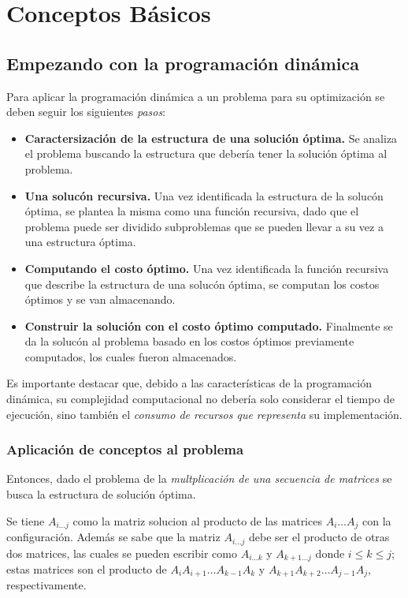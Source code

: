 \documentclass[12pt,twoside]{article}
\begin{document}
\section{Conceptos B\'asicos}
\subsection{Empezando con la programaci\'on din\'amica}
Para aplicar la programaci\'on din\'amica a un problema para su optimizaci\'on se deben seguir los siguientes \textit{pasos}:

\begin{itemize}
    \item \textbf{Caractersizaci\'on de la estructura de una soluci\'on \'optima.} Se analiza el problema buscando la estructura que deber\'ia tener la soluci\'on \'optima al problema.
    \item \textbf{Una soluc\'on recursiva.} Una vez identificada la estructura de la soluc\'on \'optima, se plantea la misma como una funci\'on recursiva, dado que el problema puede ser dividido subproblemas que se pueden llevar a su vez a una estructura \'optima.
    \item \textbf{Computando el costo \'optimo.} Una vez identificada la funci\'on recursiva que describe la estructura de una soluc\'on \'optima, se computan los costos \'optimos y se van almacenando.
    \item \textbf{Construir la soluci\'on con el costo \'optimo computado.} Finalmente se da la soluc\'on al problema basado en los costos \'optimos previamente computados, los cuales fueron almacenados.
\end{itemize}

Es importante destacar que, debido a las caracter\'isticas de la programaci\'on din\'amica, su complejidad computacional no deber\'ia solo considerar el tiempo de ejecuci\'on, sino tambi\'en el \textit{consumo de recursos que representa} su implementaci\'on.

\subsubsection{Aplicaci\'on de conceptos al problema}

Entonces, dado el problema de la \textit{multplicaci\'on de una secuencia de matrices} se busca la estructura de soluci\'on \'optima. 

Se tiene $A_{i\dots j}$ como la matriz solucion al producto de las matrices $A_i \dots A_j$ con la configuraci\'on. Adem\'as se sabe que la matriz $A_{i \dots j}$ debe ser el producto de otras dos matrices, las cuales se pueden escribir como $A_{i \dots k}$ y $A_{k+1 \dots j}$ donde $i \leq k \leq j$; estas matrices son el producto de $A_i A_{i+1} \dots A_{k-1} A_k$ y $A_{k + 1} A_{k+2} \dots A_{j-1} A_j$, respectivamente.
\end{document}

